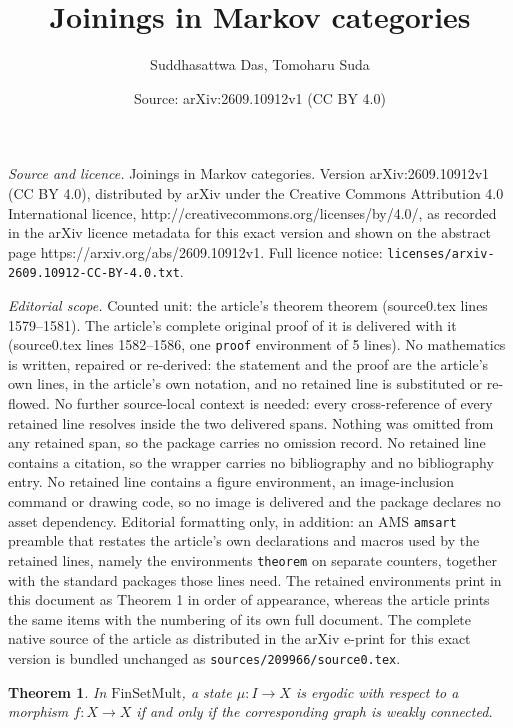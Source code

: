 \documentclass[10pt,a4paper]{amsart}
\title{Joinings in Markov categories}
\author{Suddhasattwa Das, Tomoharu Suda}
\date{Source: arXiv:2609.10912v1 (CC BY 4.0)}
\newtheorem{theorem}{Theorem}
\begin{document}
\maketitle

\noindent\emph{Source and licence.} Joinings in Markov categories. Version arXiv:2609.10912v1 (CC BY 4.0), distributed by arXiv under the Creative Commons Attribution 4.0 International licence, http://creativecommons.org/licenses/by/4.0/, as recorded in the arXiv licence metadata for this exact version and shown on the abstract page https://arxiv.org/abs/2609.10912v1. Full licence notice: \texttt{licenses/arxiv-2609.10912-CC-BY-4.0.txt}.\par\smallskip

\noindent\textit{Editorial scope.} Counted unit: the article's theorem theorem (source0.tex lines 1579--1581). The article's complete original proof of it is delivered with it (source0.tex lines 1582--1586, one \texttt{proof} environment of 5 lines). No mathematics is written, repaired or re-derived: the statement and the proof are the article's own lines, in the article's own notation, and no retained line is substituted or re-flowed.  No further source-local context is needed: every cross-reference of every retained line resolves inside the two delivered spans.  Nothing was omitted from any retained span, so the package carries no omission record.  No retained line contains a citation, so the wrapper carries no bibliography and no bibliography entry.  No retained line contains a figure environment, an image-inclusion command or drawing code, so no image is delivered and the package declares no asset dependency.  Editorial formatting only, in addition: an AMS \texttt{amsart} preamble that restates the article's own declarations and macros used by the retained lines, namely the environments \texttt{theorem} on separate counters, together with the standard packages those lines need.  The retained environments print in this document as Theorem 1 in order of appearance, whereas the article prints the same items with the numbering of its own full document.  The complete native source of the article as distributed in the arXiv e-print for this exact version is bundled unchanged as \texttt{sources/209966/source0.tex}.
\begin{theorem}
	In $\mathrm{FinSetMult}$, a state $\mu: I \to X$ is ergodic with respect to a morphism $f:X \to X$ if and only if the corresponding graph is weakly connected.
\end{theorem}
\end{document}
